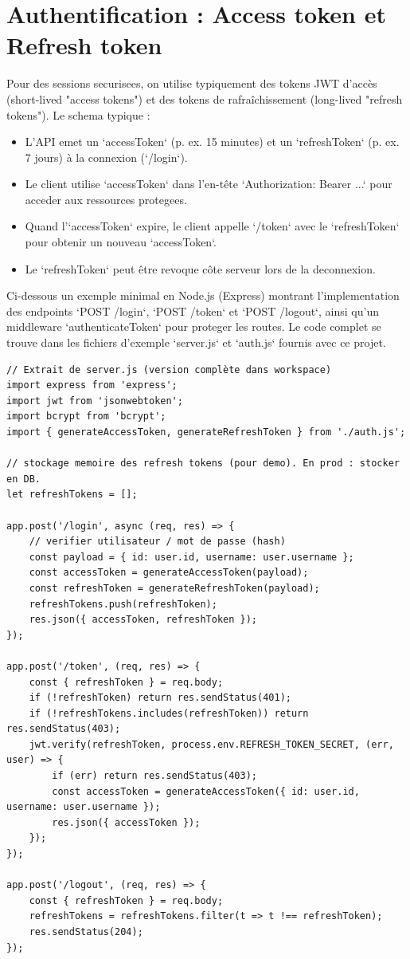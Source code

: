 \documentclass[a4paper,12pt]{book}
\begin{document}
\section{Authentification : Access token et Refresh token}

Pour des sessions securisees, on utilise typiquement des tokens JWT d'accès
(short-lived "access tokens") et des tokens de rafraîchissement (long-lived
"refresh tokens"). Le schema typique :

\begin{itemize}
        \item L'API emet un `accessToken` (p. ex. 15 minutes) et un `refreshToken`
        (p. ex. 7 jours) à la connexion (`/login`).
        \item Le client utilise `accessToken` dans l'en-tête `Authorization: Bearer ...`
        pour acceder aux ressources protegees.
        \item Quand l'`accessToken` expire, le client appelle `/token` avec le
        `refreshToken` pour obtenir un nouveau `accessToken`.
        \item Le `refreshToken` peut être revoque côte serveur lors de la deconnexion.
\end{itemize}

Ci-dessous un exemple minimal en Node.js (Express) montrant l'implementation
des endpoints `POST /login`, `POST /token` et `POST /logout`, ainsi qu'un
middleware `authenticateToken` pour proteger les routes. Le code complet se
trouve dans les fichiers d'exemple `server.js` et `auth.js` fournis avec ce projet.

\begin{lstlisting}[style=javascript, caption=Exemple minimal d'authentification avec refresh tokens]
// Extrait de server.js (version complète dans workspace)
import express from 'express';
import jwt from 'jsonwebtoken';
import bcrypt from 'bcrypt';
import { generateAccessToken, generateRefreshToken } from './auth.js';

// stockage memoire des refresh tokens (pour demo). En prod : stocker en DB.
let refreshTokens = [];

app.post('/login', async (req, res) => {
    // verifier utilisateur / mot de passe (hash)
    const payload = { id: user.id, username: user.username };
    const accessToken = generateAccessToken(payload);
    const refreshToken = generateRefreshToken(payload);
    refreshTokens.push(refreshToken);
    res.json({ accessToken, refreshToken });
});

app.post('/token', (req, res) => {
    const { refreshToken } = req.body;
    if (!refreshToken) return res.sendStatus(401);
    if (!refreshTokens.includes(refreshToken)) return res.sendStatus(403);
    jwt.verify(refreshToken, process.env.REFRESH_TOKEN_SECRET, (err, user) => {
        if (err) return res.sendStatus(403);
        const accessToken = generateAccessToken({ id: user.id, username: user.username });
        res.json({ accessToken });
    });
});

app.post('/logout', (req, res) => {
    const { refreshToken } = req.body;
    refreshTokens = refreshTokens.filter(t => t !== refreshToken);
    res.sendStatus(204);
});
\end{lstlisting}
\end{document}
